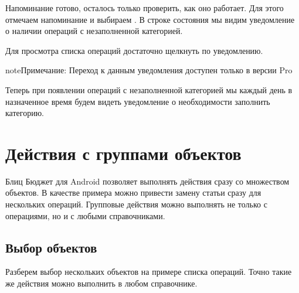 \documentclass[a4paper,10pt,russian]{sphinxmanual}
\begin{document}
\sphinxAtStartPar
Напоминание готово, осталось только проверить, как оно работает. Для этого отмечаем напоминание и выбираем
. В строке состояния мы видим уведомление о наличии операций с незаполненной категорией.

\noindent{}
\noindent{}
\noindent{}

\sphinxAtStartPar
Для просмотра списка операций достаточно щелкнуть по уведомлению.

\begin{sphinxadmonition}{note}{Примечание:}
\sphinxAtStartPar
Переход к данным уведомления доступен только в версии Pro
\end{sphinxadmonition}

\sphinxAtStartPar
Теперь при появлении операций с незаполненной категорией мы каждый день в назначенное время
будем видеть уведомление о необходимости заполнить категорию.

\sphinxstepscope


\chapter{Действия с группами объектов}
\label{\detokenize{bulk-actions:chapter-bulk-actions}}\label{\detokenize{bulk-actions:id1}}\label{\detokenize{bulk-actions::doc}}
\sphinxAtStartPar
Блиц Бюджет для Android позволяет выполнять действия сразу со множеством объектов. В качестве примера можно привести замену
статьи сразу для нескольких операций. Групповые действия можно выполнять не только с операциями, но и с
любыми справочниками.


\section{Выбор объектов}
\label{\detokenize{bulk-actions:id2}}
\sphinxAtStartPar
Разберем выбор нескольких объектов на примере списка операций. Точно такие же действия можно выполнить в
любом справочнике.

\noindent{}
\noindent{}
\noindent{}
\end{document}
